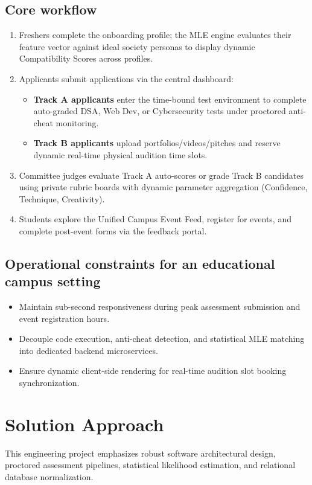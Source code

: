 \documentclass[11pt,a4paper]{article}
\begin{document}
\subsection{Core workflow}
\begin{enumerate}[leftmargin=0.7cm]
    \item Freshers complete the onboarding profile; the MLE engine evaluates their feature vector against ideal society personas to display dynamic Compatibility Scores across profiles.
    \item Applicants submit applications via the central dashboard:
    \begin{itemize}
        \item \textbf{Track A applicants} enter the time-bound test environment to complete auto-graded DSA, Web Dev, or Cybersecurity tests under proctored anti-cheat monitoring.
        \item \textbf{Track B applicants} upload portfolios/videos/pitches and reserve dynamic real-time physical audition time slots.
    \end{itemize}
    \item Committee judges evaluate Track A auto-scores or grade Track B candidates using private rubric boards with dynamic parameter aggregation (Confidence, Technique, Creativity).
    \item Students explore the Unified Campus Event Feed, register for events, and complete post-event forms via the feedback portal.
\end{enumerate}

\subsection{Operational constraints for an educational campus setting}
\begin{itemize}[leftmargin=0.7cm]
    \item Maintain sub-second responsiveness during peak assessment submission and event registration hours.
    \item Decouple code execution, anti-cheat detection, and statistical MLE matching into dedicated backend microservices.
    \item Ensure dynamic client-side rendering for real-time audition slot booking synchronization.
\end{itemize}

\section{Solution Approach}
This engineering project emphasizes robust software architectural design, proctored assessment pipelines, statistical likelihood estimation, and relational database normalization.
\end{document}
